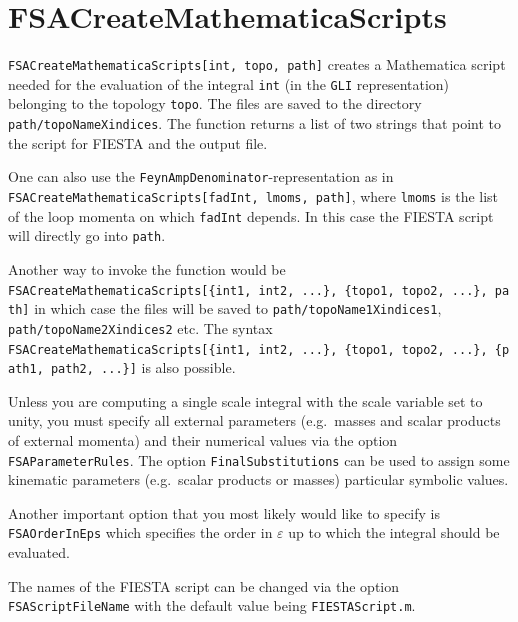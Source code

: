 \documentclass[../FeynHelpersManual.tex]{subfiles}
\begin{document}
\hypertarget{fsacreatemathematicascripts}{
\section{FSACreateMathematicaScripts}\label{fsacreatemathematicascripts}}

\texttt{FSACreateMathematicaScripts[\allowbreak{}int,\ \allowbreak{}topo,\ \allowbreak{}path]}
creates a Mathematica script needed for the evaluation of the integral
\texttt{int} (in the \texttt{GLI} representation) belonging to the
topology \texttt{topo}. The files are saved to the directory
\texttt{path/topoNameXindices}. The function returns a list of two
strings that point to the script for FIESTA and the output file.

One can also use the \texttt{FeynAmpDenominator}-representation as in
\texttt{FSACreateMathematicaScripts[\allowbreak{}fadInt,\ \allowbreak{}lmoms,\ \allowbreak{}path]},
where \texttt{lmoms} is the list of the loop momenta on which
\texttt{fadInt} depends. In this case the FIESTA script will directly go
into \texttt{path}.

Another way to invoke the function would be
\texttt{FSACreateMathematicaScripts[\allowbreak{}\{\allowbreak{}int1,\ \allowbreak{}int2,\ \allowbreak{}...\},\ \allowbreak{}\{\allowbreak{}topo1,\ \allowbreak{}topo2,\ \allowbreak{}...\},\ \allowbreak{}path]}
in which case the files will be saved to
\texttt{path/topoName1Xindices1}, \texttt{path/topoName2Xindices2} etc.
The syntax
\texttt{FSACreateMathematicaScripts[\allowbreak{}\{\allowbreak{}int1,\ \allowbreak{}int2,\ \allowbreak{}...\},\ \allowbreak{}\{\allowbreak{}topo1,\ \allowbreak{}topo2,\ \allowbreak{}...\},\ \allowbreak{}\{\allowbreak{}path1,\ \allowbreak{}path2,\ \allowbreak{}...\}]}
is also possible.

Unless you are computing a single scale integral with the scale variable
set to unity, you must specify all external parameters (e.g.~masses and
scalar products of external momenta) and their numerical values via the
option \texttt{FSAParameterRules}. The option
\texttt{FinalSubstitutions} can be used to assign some kinematic
parameters (e.g.~scalar products or masses) particular symbolic values.

Another important option that you most likely would like to specify is
\texttt{FSAOrderInEps} which specifies the order in \(\varepsilon\) up
to which the integral should be evaluated.

The names of the FIESTA script can be changed via the option
\texttt{FSAScriptFileName} with the default value being
\texttt{FIESTAScript.m}.
\end{document}
